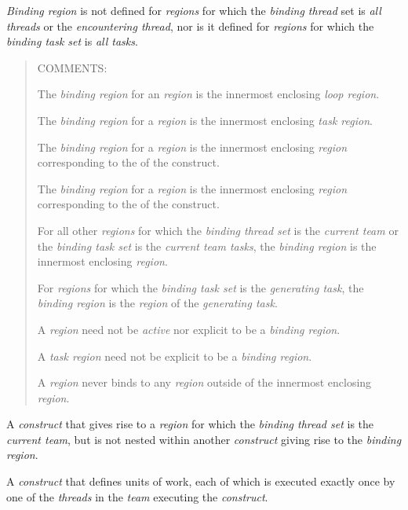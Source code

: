 \emph{Binding region} is not defined for \emph{regions} for which the \emph{binding thread} set is \emph{all threads}
or the \emph{encountering thread}, nor is it defined for \emph{regions} for which the \emph{binding task set} is 
\emph{all tasks}.

\begin{quote}
COMMENTS: 

The \emph{binding region} for an  \emph{region} is the innermost enclosing 
\emph{loop region}.

The \emph{binding region} for a  \emph{region} is the innermost enclosing 
\emph{task region}.

The \emph{binding region} for a  \emph{region} is the innermost enclosing \emph{region} corresponding to the  of the  construct.

The \emph{binding region} for a  \emph{region} is the innermost enclosing \emph{region} corresponding to the  of the  construct.

For all other \emph{regions} for which the \emph{binding thread set} is the \emph{current
team} or the \emph{binding task set} is the \emph{current team tasks}, the \emph{binding 
region} is the innermost enclosing  \emph{region}.

For \emph{regions} for which the \emph{binding task set} is the \emph{generating task}, the 
\emph{binding region} is the \emph{region} of the \emph{generating task}.

A  \emph{region} need not be \emph{active} nor explicit to be a \emph{binding region}.

A \emph{task region} need not be explicit to be a \emph{binding region}.

A \emph{region} never binds to any \emph{region} outside of the innermost enclosing 
 \emph{region}.
\end{quote}
\glossarydefend

\glossarydefstart
A \emph{construct} that gives rise to a \emph{region} for which the \emph{binding thread set} is the \emph{current 
team}, but is not nested within another \emph{construct} giving rise to the \emph{binding region}.
\glossarydefend

\glossarydefstart
A \emph{construct} that defines units of work, each of which is executed exactly once by 
one of the \emph{threads} in the \emph{team} executing the \emph{construct}.

